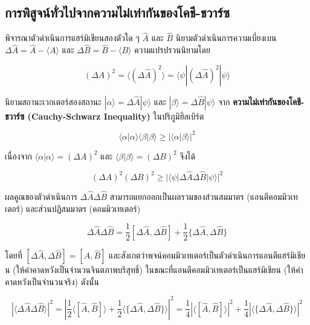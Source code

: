 \subsection{การพิสูจน์ทั่วไปจากความไม่เท่ากันของโคชี-ชวาร์ซ}

พิจารณาตัวดำเนินการแฮร์มิเชียนสองตัวใด ๆ $\hat{A}$ และ $\hat{B}$ นิยามตัวดำเนินการความเบี่ยงเบน $\Delta \hat{A} = \hat{A} - \langle A \rangle$ และ $\Delta \hat{B} = \hat{B} - \langle B \rangle$ ความแปรปรวนนิยามโดย

\begin{equation}
(\Delta A)^2 = \langle (\Delta \hat{A})^2 \rangle = \langle \psi | (\Delta \hat{A})^2 | \psi \rangle
\end{equation}

นิยามสถานะเวกเตอร์สองสถานะ $|\alpha\rangle = \Delta \hat{A}|\psi\rangle$ และ $|\beta\rangle = \Delta \hat{B}|\psi\rangle$ จาก \textbf{ความไม่เท่ากันของโคชี-ชวาร์ซ (Cauchy-Schwarz Inequality)} ในปริภูมิฮิลเบิร์ต

\begin{equation}
\langle \alpha | \alpha \rangle \langle \beta | \beta \rangle \ge |\langle \alpha | \beta \rangle|^2
\label{eq:cauchy_schwarz}
\end{equation}

เนื่องจาก $\langle \alpha | \alpha \rangle = (\Delta A)^2$ และ $\langle \beta | \beta \rangle = (\Delta B)^2$ จึงได้

\begin{equation}
(\Delta A)^2 (\Delta B)^2 \ge |\langle \psi | \Delta \hat{A} \Delta \hat{B} | \psi \rangle|^2
\label{eq:variance_product}
\end{equation}

ผลคูณของตัวดำเนินการ $\Delta \hat{A} \Delta \hat{B}$ สามารถแยกออกเป็นผลรวมของส่วนสมมาตร (แอนตีคอมมิวเทเตอร์) และส่วนปฏิสมมาตร (คอมมิวเทเตอร์)

\begin{equation}
\Delta \hat{A} \Delta \hat{B} = \frac{1}{2}[\Delta \hat{A}, \Delta \hat{B}] + \frac{1}{2}\{\Delta \hat{A}, \Delta \hat{B}\}
\end{equation}

โดยที่ $[\Delta \hat{A}, \Delta \hat{B}] = [\hat{A}, \hat{B}]$ และสังเกตว่าพจน์คอมมิวเทเตอร์เป็นตัวดำเนินการแอนตีแฮร์มิเชียน (ให้ค่าคาดหวังเป็นจำนวนจินตภาพบริสุทธิ์) ในขณะที่แอนตีคอมมิวเทเตอร์เป็นแฮร์มิเชียน (ให้ค่าคาดหวังเป็นจำนวนจริง) ดังนั้น

\begin{equation}
|\langle \Delta \hat{A} \Delta \hat{B} \rangle|^2 = \left| \frac{1}{2}\langle [\hat{A}, \hat{B}] \rangle + \frac{1}{2}\langle \{\Delta \hat{A}, \Delta \hat{B}\} \rangle \right|^2 = \frac{1}{4}|\langle [\hat{A}, \hat{B}] \rangle|^2 + \frac{1}{4}|\langle \{\Delta \hat{A}, \Delta \hat{B}\} \rangle|^2
\end{equation}

